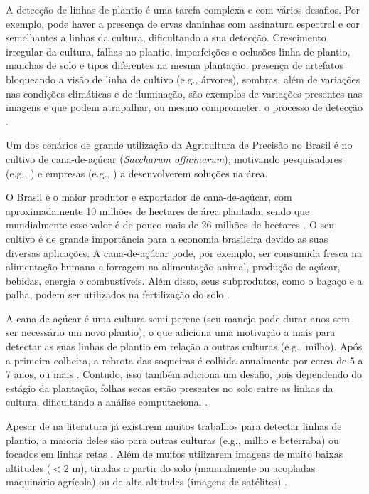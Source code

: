 \documentclass[12pt, a4paper, english, brazil]{article}
\begin{document}
A detecção de linhas de plantio é uma tarefa complexa e com vários desafios. Por exemplo, pode haver a presença de ervas daninhas com assinatura espectral e cor semelhantes a linhas da cultura, dificultando a sua detecção. Crescimento irregular da cultura, falhas no plantio, imperfeições e oclusões linha de plantio, manchas de solo e tipos diferentes na mesma plantação, presença de artefatos bloqueando a visão de linha de cultivo (e.g., árvores), sombras, além de variações nas condições climáticas e de iluminação, são exemplos de variações presentes nas imagens e que podem atrapalhar, ou mesmo comprometer, o processo de detecção  \cite{Rabab_2021, Doha_2021}.

Um dos cenários de grande utilização da Agricultura de Precisão no Brasil é no cultivo de cana-de-açúcar (\textit{Saccharum officinarum}), motivando pesquisadores (e.g., ) e empresas (e.g., ) a desenvolverem soluções na área.

O Brasil é o maior produtor e exportador de cana-de-açúcar, com aproximadamente 10 milhões de hectares de área plantada, sendo que mundialmente esse valor é de pouco mais de 26 milhões de hectares \cite{Ritchie_2020, IBGE_2021, FAOSTAT_2021}. O seu cultivo é de grande importância para a economia brasileira devido as suas diversas aplicações. A cana-de-açúcar pode, por exemplo, ser consumida fresca na alimentação humana e forragem na alimentação animal, produção de açúcar, bebidas, energia e combustíveis. Além disso, seus subprodutos, como o bagaço e a palha, podem ser utilizados na fertilização do solo \cite{Oliveira_2018}.

A cana-de-açúcar é uma cultura semi-perene (seu manejo pode durar anos sem ser necessário um novo plantio), o que adiciona uma motivação a mais para detectar as suas linhas de plantio em relação a outras culturas (e.g., milho). Após a primeira colheira, a rebrota das soqueiras é colhida anualmente por cerca de 5 a 7 anos, ou mais \cite{Rudorff_2010}. Contudo, isso também adiciona um desafio, pois dependendo do estágio da plantação, folhas secas estão presentes no solo entre as linhas da cultura, dificultando a análise computacional \cite{Silva_2020}.

Apesar de na literatura já existirem muitos trabalhos para detectar linhas de plantio, a maioria deles são para outras culturas (e.g., milho e beterraba) ou focados em linhas retas \cite{Pereira_Junior_2020}. Além de muitos utilizarem imagens de muito baixas altitudes ($< 2$ m), tiradas a partir do solo (manualmente ou acopladas maquinário agrícola) ou de alta altitudes (imagens de satélites) \cite{Hasan_2021}.
\end{document}
